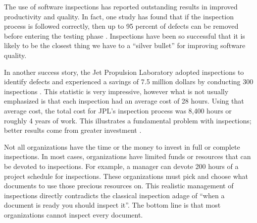

\label{sec:intro}
The use of software inspections has reported outstanding results in
improved productivity and quality. In fact, one study has found that if the
inspection process is followed correctly, then up to 95 percent of defects
can be removed before entering the testing phase \cite{Bush90}.
Inspections have been so successful that it is likely to be the closest
thing we have to a ``silver bullet'' for improving software quality.


In another success story, the Jet Propulsion Laboratory adopted inspections
to identify defects and experienced a savings of 7.5 million dollars by
conducting 300 inspections \cite{Bush90a}. This statistic is very
impressive, however what is not usually emphasized is that each inspection
had an average cost of 28 hours. Using that average cost, the total cost
for JPL's inspection process was 8,400 hours or roughly 4 years of work.
This illustrates a fundamental problem with inspections; better results
come from greater investment \cite{Gilb93}.

Not all organizations have the time or the money to invest in full or
complete inspections. In most cases, organizations have limited funds or
resources that can be devoted to inspections. For example, a manager can
devote 200 hours of a project schedule for inspections. These organizations
must pick and choose what documents to use those precious resources on.
This realistic management of inspections directly contradicts the classical
inspection adage of ``when a document is ready you should inspect it''. The
bottom line is that most organizations cannot inspect every document.

